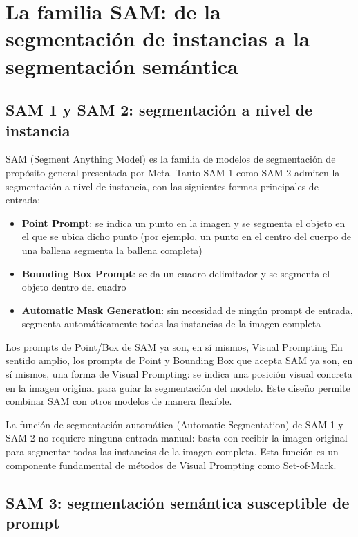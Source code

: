 \section{La familia SAM: de la segmentación de instancias a la segmentación semántica}

\subsection{SAM 1 y SAM 2: segmentación a nivel de instancia}

SAM (Segment Anything Model) es la familia de modelos de segmentación de propósito general presentada por Meta. Tanto SAM 1 como SAM 2 admiten la segmentación a nivel de instancia, con las siguientes formas principales de entrada:

\begin{itemize}
    \item \textbf{Point Prompt}: se indica un punto en la imagen y se segmenta el objeto en el que se ubica dicho punto (por ejemplo, un punto en el centro del cuerpo de una ballena segmenta la ballena completa)
    \item \textbf{Bounding Box Prompt}: se da un cuadro delimitador y se segmenta el objeto dentro del cuadro
    \item \textbf{Automatic Mask Generation}: sin necesidad de ningún prompt de entrada, segmenta automáticamente todas las instancias de la imagen completa
\end{itemize}

\begin{knowledgebox}{Los prompts de Point/Box de SAM ya son, en sí mismos, Visual Prompting}
En sentido amplio, los prompts de Point y Bounding Box que acepta SAM ya son, en sí mismos, una forma de Visual Prompting: se indica una posición visual concreta en la imagen original para guiar la segmentación del modelo. Este diseño permite combinar SAM con otros modelos de manera flexible.
\end{knowledgebox}

La función de segmentación automática (Automatic Segmentation) de SAM 1 y SAM 2 no requiere ninguna entrada manual: basta con recibir la imagen original para segmentar todas las instancias de la imagen completa. Esta función es un componente fundamental de métodos de Visual Prompting como Set-of-Mark.

\subsection{SAM 3: segmentación semántica susceptible de prompt}

